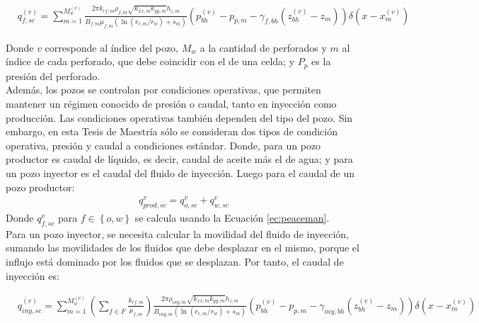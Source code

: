\begin{footnotesize}
	\begin{align}
	\label{ec:peaceman}&q^{(v)}_{f, sc} = \sum_{m=1}^{M^{(v)}_{w}}\frac{2\pi k_{rf,m} \rho_{f,m} \sqrt{k_{xx,m}k_{yy,m}}h_{z,m}}{B_{f,m}\mu_{f,m}\left(\ln \left(r_{e,m}/r_{w}\right) +s_{m}\right)}\left(p_{bh}^{(v)}-p_{p,m}-\gamma_{f,bh}\left(z_{bh}^{(v)}-z_{m}\right)\right)\delta\left(x-x_{m}^{(v)}\right)
	\end{align}
\end{footnotesize}
Donde $v$ corresponde al índice del pozo, $M_{w}$ a la cantidad de perforados y $m$ al índice de cada perforado, que debe coincidir con el de una celda; y $P_{p}$ es la presión del perforado.\\

Además, los pozos se controlan por condiciones operativas, que permiten mantener un régimen conocido de presión o caudal, tanto en inyección como producción. Las condiciones operativas también dependen del tipo del pozo. Sin embargo, en esta Tesis de Maestría sólo se consideran dos tipos de condición operativa, presión y caudal a condiciones estándar. Donde, para un pozo productor es caudal de líquido, es decir, caudal de aceite más el de agua; y para un pozo inyector es el caudal del fluido de inyección. Luego para el caudal de un pozo productor:
\begin{align}
	q^{v}_{prod,sc} = q^{v}_{o,sc} + q^{v}_{w,sc}
\end{align}
Donde $q^{v}_{f,sc}$ para $f \in \left\lbrace o,w \right\rbrace$ se calcula usando la Ecuación \ref{ec:peaceman}.\\

Para un pozo inyector, se necesita calcular la movilidad del fluido de inyección, sumando las movilidades de los fluidos que debe desplazar en el mismo, porque el influjo está dominado por los fluidos que se desplazan. Por tanto, el caudal de inyección es:

\begin{scriptsize}
	\begin{align}
	\label{ec:peacemaniny}&q^{(v)}_{iny, sc} = \sum_{m=1}^{M^{(v)}_{w}}\left(\sum_{f \in F}\frac{k_{rf,m}}{\mu_{f,m}}\right)\frac{2\pi \rho_{iny,m} \sqrt{k_{xx,m}k_{yy,m}}h_{z,m}}{B_{iny,m}\left(\ln \left(r_{e,m}/r_{w}\right) +s_{m}\right)}\left(p_{bh}^{(v)}-p_{p,m}-\gamma_{iny,bh}\left(z_{bh}^{(v)}-z_{m}\right)\right)\delta\left(x-x_{m}^{(v)}\right)
	\end{align}
\end{scriptsize}

